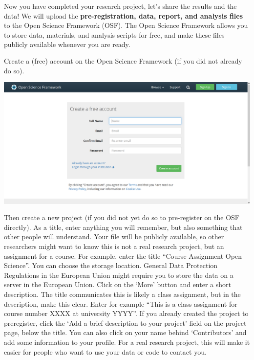 \documentclass[
  oneside]{krantz}
\begin{document}
Now you have completed your research project, let's share the results and the data! We will upload the \textbf{pre-registration, data, report, and analysis files} to the Open Science Framework (OSF). The Open Science Framework allows you to store data, materials, and analysis scripts for free, and make these files publicly available whenever you are ready.

Create a (free) account on the Open Science Framework (if you did not already do
so).

\begin{center}\includegraphics[width=1\linewidth]{images/7d6b26f83fee88df8bd46f30f4441844} \end{center}

Then create a new project (if you did not yet do so to pre-register on the OSF directly). As a title, enter anything you will remember, but also something that other people will understand. Your file will be publicly available, so other researchers might want to know this is not a real research project, but an assignment for a course. For example, enter the title ``Course Assignment Open Science''. You can choose the storage location. General Data Protection Regulations in the European Union might require you to store the data on a server in the European Union. Click on the `More' button and enter a short description. The title communicates this is likely a class assignment, but in the description, make this clear. Enter for example ``This is a class assignment for course number XXXX at university YYYY''. If you already created the project to preregister, click the `Add a brief description to your project' field on the project page, below the title. You can also click on your name behind `Contributors' and add some information to your profile. For a real research project, this will make it easier for people who want to use your data or code to contact you.
\end{document}
